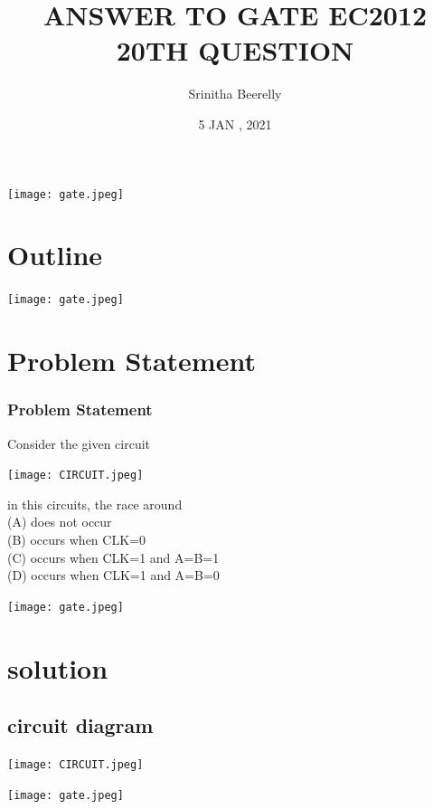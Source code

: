 \documentclass{beamer}
\title{ ANSWER TO GATE EC2012 20TH QUESTION}
\author{Srinitha Beerelly}
\date{5 JAN , 2021}
\numberwithin{equation}{section}
\begin{document}
\begin{frame}
\titlepage
\begin{corner}
\texttt{[image: gate.jpeg]}
\end{corner}
\end{frame}

\section*{Outline}
\begin{frame}
\tableofcontents
\begin{corner}
\texttt{[image: gate.jpeg]}
\end{corner}
\end{frame}
\section{Problem Statement}
\begin{frame}
\frametitle{Problem Statement}
%
Consider the given circuit
\break

\begin{center}
\texttt{[image: CIRCUIT.jpeg]}
\end{center}


in this circuits, the race around \\
(A) does not occur\\
(B) occurs when CLK=0\\
(C) occurs when CLK=1 and A=B=1\\
(D) occurs when CLK=1 and A=B=0\\
\begin{corner}
\texttt{[image: gate.jpeg]}
\end{corner}

\end{frame}

\section{solution}
\subsection{circuit diagram}
\begin{frame}
\begin{center}
\texttt{[image: CIRCUIT.jpeg]}
\end{center}




\begin{corner}
\texttt{[image: gate.jpeg]}
\end{corner}
\end{frame}
\end{document}
